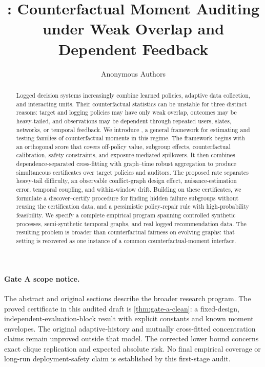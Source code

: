 \documentclass{article}
\title{\COMET: Counterfactual Moment Auditing\\under Weak Overlap and Dependent Feedback}
\author{Anonymous Authors}
\theoremstyle{plain}
\theoremstyle{definition}
\theoremstyle{remark}
\begin{document}
\maketitle

\begin{abstract}
Logged decision systems increasingly combine learned policies, adaptive data collection, and interacting units. Their counterfactual statistics can be unstable for three distinct reasons: target and logging policies may have only weak overlap, outcomes may be heavy-tailed, and observations may be dependent through repeated users, slates, networks, or temporal feedback. We introduce \COMET, a general framework for estimating and testing families of counterfactual moments in this regime. The framework begins with an orthogonal score that covers off-policy value, subgroup effects, counterfactual calibration, safety constraints, and exposure-mediated spillovers. It then combines dependence-separated cross-fitting with graph--time robust aggregation to produce simultaneous certificates over target policies and auditors. The proposed rate separates heavy-tail difficulty, an observable conflict-graph design effect, nuisance-estimation error, temporal coupling, and within-window drift. Building on these certificates, we formulate a discover--certify procedure for finding hidden failure subgroups without reusing the certification data, and a pessimistic policy-repair rule with high-probability feasibility. We specify a complete empirical program spanning controlled synthetic processes, semi-synthetic temporal graphs, and real logged recommendation data. The resulting problem is broader than counterfactual fairness on evolving graphs: that setting is recovered as one instance of a common counterfactual-moment interface.
\end{abstract}

\paragraph{Gate A scope notice.}
The abstract and original sections describe the broader research program.
The proved certificate in this audited draft is \cref{thm:gate-a-clean}:
a fixed-design, independent-evaluation-block result with explicit constants
and known moment envelopes. The original adaptive-history and mutually
cross-fitted concentration claims remain unproved outside that model.
The corrected lower bound concerns exact clique replication and expected
absolute risk. No final empirical coverage or long-run deployment-safety
claim is established by this first-stage audit.
\end{document}
